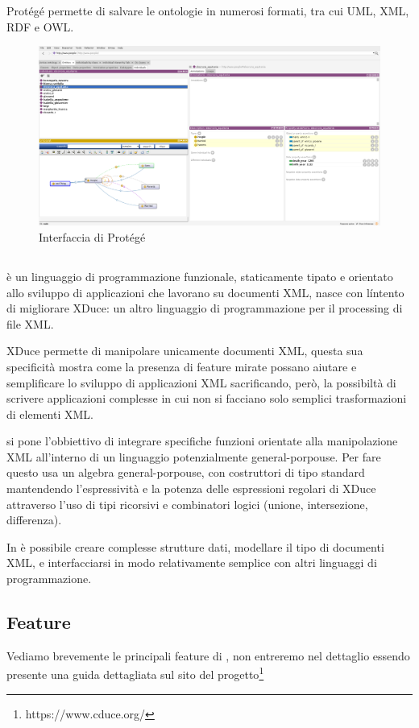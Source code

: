 Protégé permette di salvare le ontologie in numerosi formati, tra cui UML, XML, RDF e OWL.
\begin{figure}[h]
	\centering
	\includegraphics[width=\textwidth]{Picture/interface_protege.png}
	\caption{Interfaccia di Protégé}
\end{figure}
\subsection{\cduce}
\cduce è un linguaggio di programmazione funzionale, staticamente tipato e orientato allo sviluppo di applicazioni che lavorano su documenti XML\cite{cduceLanguage}, nasce con líntento di migliorare XDuce: un altro linguaggio di programmazione per il processing di file XML\cite{hosoya2003xduce}. 

XDuce permette di manipolare unicamente documenti XML, questa sua specificità mostra come la presenza di feature mirate possano aiutare e semplificare lo sviluppo di applicazioni XML sacrificando, però, la possibiltà di scrivere applicazioni complesse in cui non si facciano solo semplici trasformazioni di elementi XML.

\cduce si pone l'obbiettivo di integrare specifiche funzioni orientate alla manipolazione XML all'interno di un linguaggio potenzialmente general-porpouse. Per fare questo \cduce usa un algebra general-porpouse, con costruttori di tipo standard mantendendo l'espressività e la potenza delle espressioni regolari di XDuce attraverso l'uso di tipi ricorsivi e combinatori logici (unione, intersezione, differenza).

In \cduce è possibile creare complesse strutture dati, modellare il tipo di documenti XML, e interfacciarsi in modo relativamente semplice con altri linguaggi di programmazione\cite{cduceLanguage}.
\subsection{Feature}\label{fature_cduce}
Vediamo brevemente le principali feature di \cduce, non entreremo nel dettaglio essendo presente una guida dettagliata sul sito del progetto\footnote{https://www.cduce.org/}
